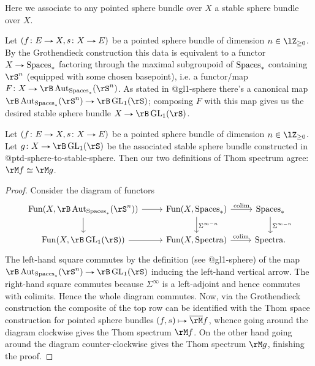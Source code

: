 \begin{construction}
  \label{ptd-sphere-to-stable-sphere}
  Here we associate to any pointed sphere bundle over $X$ a stable sphere bundle over $X$.

  Let $(f \c E \to X, s \c X \to E)$ be a pointed sphere bundle of dimension $n \in \lZ_{\ge 0}$. By the Grothendieck construction this data is equivalent to a functor $X \to \Spaces_*$ factoring through the maximal subgroupoid of $\mathrm{Spaces}_*$ containing $\rS^n$ (equipped with some chosen basepoint), i.e. a functor/map $F \c X \to \rB\Aut_{\Spaces_*}(\rS^n)$. As stated in @gl1-sphere there's a canonical map $\rB\Aut_{\Spaces_*}(\rS^n) \to \rB\GL_1(\rS)$; composing $F$ with this map gives us the desired stable sphere bundle $X \to \rB\GL_1(\rS)$.
\end{construction}

\begin{lemma}
  \label{thom-ptd-sphere-agrees}
  Let $(f \c E \to X, s \c X \to E)$ be a pointed sphere bundle of dimension $n \in \lZ_{\ge 0}$. Let $g \c X \to \rB\GL_1(\rS)$ be the associated stable sphere bundle constructed in @ptd-sphere-to-stable-sphere. Then our two definitions of Thom spectrum agree: $\rM f \iso \rM g$.
\end{lemma}

\begin{proof}
  Consider the diagram of functors
  \[
    \begin{tikzcd}
      \Fun(X, \rB\Aut_{\Spaces_*}(\rS^n)) \ar[d] \ar[r] &
      \Fun(X, \Spaces_*) \ar[d, "\Sigma^{\infty - n}"] \ar[r, "\colim"] &
      \Spaces_* \ar[d, "\Sigma^{\infty - n}"] \\
      \Fun(X, \rB\GL_1(\rS)) \ar[r] &
      \Fun(X, \Spectra) \ar[r, "\colim"] &
      \Spectra.
    \end{tikzcd}
  \]
  The left-hand square commutes by the definition (see @gl1-sphere) of the map $\rB\Aut_{\Spaces_*}(\rS^n) \to \rB\GL_1(\rS)$ inducing the left-hand vertical arrow. The right-hand square commutes because $\Sigma^\infty$ is a left-adjoint and hence commutes with colimits. Hence the whole diagram commutes. Now, via the Grothendieck construction the composite of the top row can be identified with the Thom space construction for pointed sphere bundles $(f,s) \mapsto \o\rM f$, whence going around the diagram clockwise gives the Thom spectrum $\rM f$. On the other hand going around the diagram counter-clockwise gives the Thom spectrum $\rM g$, finishing the proof.
\end{proof}

